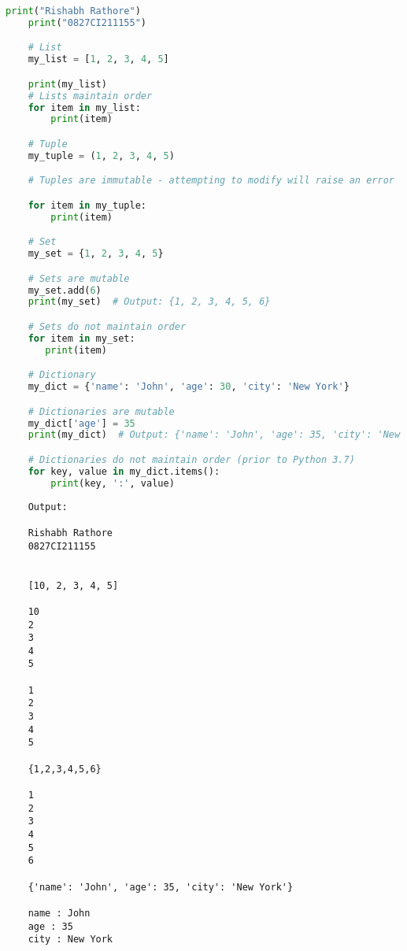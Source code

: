 \documentclass{report}
\begin{document}
\newpage


\sol 
\begin{lstlisting}[language=Python]
	print("Rishabh Rathore")
	print("0827CI211155")

	# List
	my_list = [1, 2, 3, 4, 5]

	print(my_list)
	# Lists maintain order
	for item in my_list:
    	print(item)

	# Tuple
	my_tuple = (1, 2, 3, 4, 5)

	# Tuples are immutable - attempting to modify will raise an error

	for item in my_tuple:
    	print(item)

	# Set
	my_set = {1, 2, 3, 4, 5}

	# Sets are mutable
	my_set.add(6)
	print(my_set)  # Output: {1, 2, 3, 4, 5, 6}

	# Sets do not maintain order
	for item in my_set:
 	   print(item)

	# Dictionary
	my_dict = {'name': 'John', 'age': 30, 'city': 'New York'}

	# Dictionaries are mutable
	my_dict['age'] = 35
	print(my_dict)  # Output: {'name': 'John', 'age': 35, 'city': 'New York'}

	# Dictionaries do not maintain order (prior to Python 3.7)
	for key, value in my_dict.items():
    	print(key, ':', value)


\end{lstlisting}

\begin{verbatim}
	Output:

	Rishabh Rathore
	0827CI211155


	[10, 2, 3, 4, 5]

	10
	2
	3
	4
	5

	1
	2
	3
	4
	5

	{1,2,3,4,5,6}

	1
	2
	3
	4
	5
	6

	{'name': 'John', 'age': 35, 'city': 'New York'}

	name : John
	age : 35
	city : New York

\end{verbatim}

\end{document}
